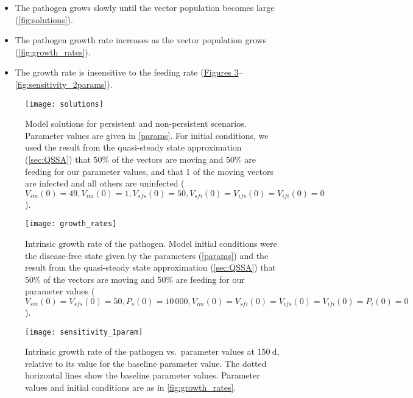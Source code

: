 \documentclass{article}
\begin{document}
\begin{itemize}
\item The pathogen grows slowly until the vector population becomes
  large (\autoref{fig:solutions}).

\item The pathogen growth rate increases as the vector population
  grows (\autoref{fig:growth_rates}).

\item The growth rate is insensitive to the feeding rate
  (\hyperref[fig:sensitivity_1param]{Figures
    \ref*{fig:sensitivity_1param}}--\ref{fig:sensitivity_2params}).
\end{itemize}


\begin{figure}
  \centering
  \texttt{[image: solutions]}
  \caption{Model solutions for persistent and non-persistent
    scenarios.  Parameter values are given in \autoref{params}.
    For initial conditions, we used the result from the quasi-steady
    state approximation (\autoref{sec:QSSA}) that $50\%$ of the
    vectors are moving and $50\%$ are feeding for our parameter
    values, and that 1 of the moving vectors are infected and all
    others are uninfected ($V_{sm}(0) = 49, V_{im}(0) = 1, V_{sfs}(0) =
    50, V_{sfi}(0) = V_{ifs}(0) = V_{ifi}(0) = 0$).}
  \label{fig:solutions}
\end{figure}

\begin{figure}
  \centering
  \texttt{[image: growth\_rates]}
  \caption{Intrinsic growth rate of the pathogen.  Model initial
    conditions were the disease-free state given by the parameters
    (\autoref{params}) and the result from the quasi-steady state
    approximation (\autoref{sec:QSSA}) that $50\%$ of the vectors are
    moving and $50\%$ are feeding for our parameter values ($V_{sm}(0)
    = V_{sfs}(0) = 50, P_s(0) = 10\,000, V_{im}(0) = V_{sfi}(0) =
    V_{ifs}(0) = V_{ifi}(0) = P_i(0) = 0$).}
  \label{fig:growth_rates}
\end{figure}

\begin{figure}
  \centering
  \texttt{[image: sensitivity\_1param]}
  \caption{Intrinsic growth rate of the pathogen vs.~parameter values
    at $150~\text{d}$, relative to its value for the baseline
    parameter value.  The dotted horizontal lines show the baseline
    parameter values.  Parameter values and initial conditions are as
    in \autoref{fig:growth_rates}.}
  \label{fig:sensitivity_1param}
\end{figure}
\end{document}
